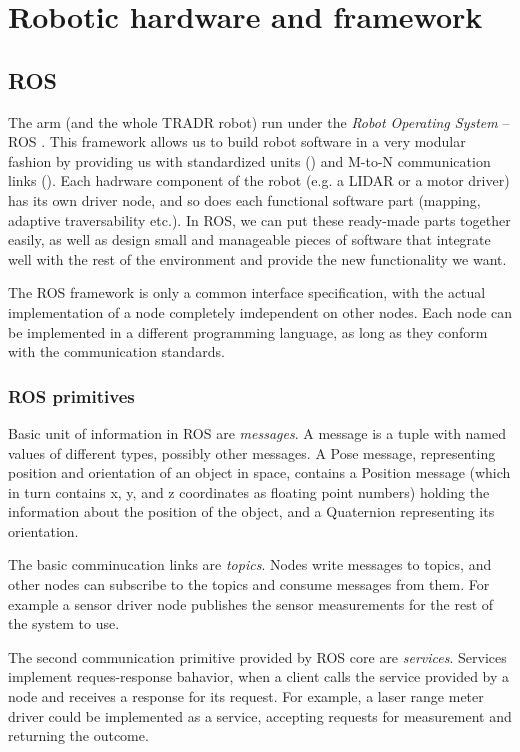 \documentclass[buriama8_dp.tex]{subfiles}
\begin{document}
\chapter{Robotic hardware and framework}

\section{ROS}
\label{sec:ros}

The arm (and the whole TRADR robot) run under the \emph{Robot Operating System} – ROS \cite{ros_paper}. This framework allows us to build robot software in a very modular fashion by providing us with standardized units () and M-to-N communication links (). Each hadrware component of the robot (e.g. a LIDAR or a motor driver) has its own driver node, and so does each functional software part (mapping, adaptive traversability etc.). In ROS, we can put these ready-made parts together easily, as well as design small and manageable pieces of software that integrate well with the rest of the environment and provide the new functionality we want.

The ROS framework is only a common interface specification, with the actual implementation of a node completely imdependent on other nodes. Each node can be implemented in a different programming language, as long as they conform with the communication standards.

\subsection{ROS primitives}
\label{subsec:ros_prims}

Basic unit of information in ROS are \emph{messages}. A message is a tuple with named values of different types, possibly other messages. A Pose message, representing position and orientation of an object in space, contains a Position message (which in turn contains \m x, \m y, and \m z coordinates as floating point numbers) holding the information about the position of the object, and a Quaternion representing its orientation.

The basic comminucation links are \emph{topics}. Nodes write messages to topics, and other nodes can subscribe to the topics and consume messages from them. For example a sensor driver node publishes the sensor measurements for the rest of the system to use.

The second communication primitive provided by ROS core are \emph{services}. Services implement reques-response bahavior, when a client calls the service provided by a node and receives a response for its request. For example, a laser range meter driver could be implemented as a service, accepting requests for measurement and returning the outcome.
\end{document}
